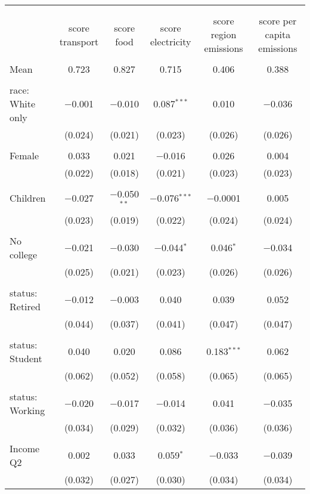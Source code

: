 
\begin{tabular}{@{\extracolsep{5pt}}lccccc} 
\\[-1.8ex]\hline 
\hline \\[-1.8ex] 
\\[-1.8ex] & score transport & score food & score electricity & score region emissions & score per capita emissions \\ 
\hline \\[-1.8ex] 
 Mean & 0.723 & 0.827 & 0.715 & 0.406 & 0.388  \\ \hline \\[-1.8ex] race: White only & $-$0.001 & $-$0.010 & 0.087$^{***}$ & 0.010 & $-$0.036 \\ 
  & (0.024) & (0.021) & (0.023) & (0.026) & (0.026) \\ 
  & & & & & \\ 
 Female & 0.033 & 0.021 & $-$0.016 & 0.026 & 0.004 \\ 
  & (0.022) & (0.018) & (0.021) & (0.023) & (0.023) \\ 
  & & & & & \\ 
 Children & $-$0.027 & $-$0.050$^{**}$ & $-$0.076$^{***}$ & $-$0.0001 & 0.005 \\ 
  & (0.023) & (0.019) & (0.022) & (0.024) & (0.024) \\ 
  & & & & & \\ 
 No college & $-$0.021 & $-$0.030 & $-$0.044$^{*}$ & 0.046$^{*}$ & $-$0.034 \\ 
  & (0.025) & (0.021) & (0.023) & (0.026) & (0.026) \\ 
  & & & & & \\ 
 status: Retired & $-$0.012 & $-$0.003 & 0.040 & 0.039 & 0.052 \\ 
  & (0.044) & (0.037) & (0.041) & (0.047) & (0.047) \\ 
  & & & & & \\ 
 status: Student & 0.040 & 0.020 & 0.086 & 0.183$^{***}$ & 0.062 \\ 
  & (0.062) & (0.052) & (0.058) & (0.065) & (0.065) \\ 
  & & & & & \\ 
 status: Working & $-$0.020 & $-$0.017 & $-$0.014 & 0.041 & $-$0.035 \\ 
  & (0.034) & (0.029) & (0.032) & (0.036) & (0.036) \\ 
  & & & & & \\ 
 Income Q2 & 0.002 & 0.033 & 0.059$^{*}$ & $-$0.033 & $-$0.039 \\ 
  & (0.032) & (0.027) & (0.030) & (0.034) & (0.034) \\ 

\end{tabular}
